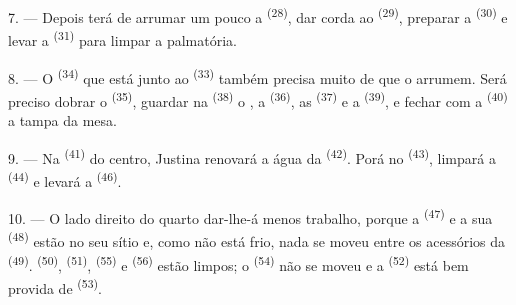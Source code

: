 7. --- Depois terá de arrumar um pouco a 
\textsuperscript{(28)}, dar corda ao  \textsuperscript{(29)},
preparar a  \textsuperscript{(30)} e levar a 
\textsuperscript{(31)} para limpar a palmatória.

\VUsaut{5.0mm}
\VUsaut{3.0mm}

8. --- O  \textsuperscript{(34)} que está junto ao
 \textsuperscript{(33)} também precisa muito de que o arrumem.
Será preciso dobrar o  \textsuperscript{(35)}, guardar na
 \textsuperscript{(38)} o , a 
\textsuperscript{(36)}, as  \textsuperscript{(37)} e a 
\textsuperscript{(39)}, e fechar com a  \textsuperscript{(40)} a tampa da
mesa.

9. --- Na  \textsuperscript{(41)} do centro, Justina renovará
a água da  \textsuperscript{(42)}. Porá
 no  \textsuperscript{(43)}, limpará a
 \textsuperscript{(44)} e levará a  \textsuperscript{(46)}.

10. --- O lado direito do quarto dar-lhe-á menos trabalho, porque a
 \textsuperscript{(47)} e a sua 
\textsuperscript{(48)} estão no seu sítio e, como não está frio, nada se moveu
entre os acessórios da  \textsuperscript{(49)}. 
\textsuperscript{(50)},  \textsuperscript{(51)}, 
\textsuperscript{(55)} e  \textsuperscript{(56)} estão limpos; o
 \textsuperscript{(54)} não se moveu e a  \textsuperscript{(52)} está bem provida de 
\textsuperscript{(53)}.



